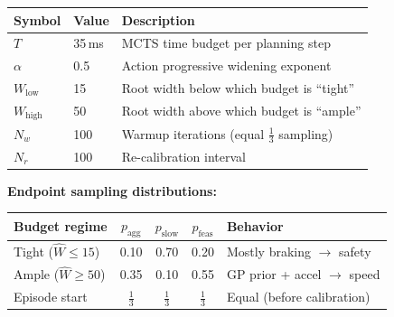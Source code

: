 \documentclass[border=10pt]{standalone}
\begin{document}
\begin{minipage}{0.85\textwidth}
\begin{center}
\renewcommand{\arraystretch}{1.3}
\begin{tabular}{l l l}
\toprule
\textbf{Symbol} & \textbf{Value} & \textbf{Description} \\
\midrule
$T$ & 35\,ms & MCTS time budget per planning step \\
$\alpha$ & 0.5 & Action progressive widening exponent \\
$W_{\text{low}}$ & 15 & Root width below which budget is ``tight'' \\
$W_{\text{high}}$ & 50 & Root width above which budget is ``ample'' \\
$N_w$ & 100 & Warmup iterations (equal $\frac{1}{3}$ sampling) \\
$N_r$ & 100 & Re-calibration interval \\
\bottomrule
\end{tabular}
\end{center}

\vspace{1em}

\noindent\textbf{Endpoint sampling distributions:}

\vspace{0.5em}

\begin{center}
\renewcommand{\arraystretch}{1.3}
\begin{tabular}{l c c c l}
\toprule
\textbf{Budget regime} & $p_{\text{agg}}$ & $p_{\text{slow}}$ & $p_{\text{feas}}$ & \textbf{Behavior} \\
\midrule
Tight\; ($\hat{W} \leq 15$) & 0.10 & 0.70 & 0.20 & Mostly braking $\to$ safety \\
Ample\; ($\hat{W} \geq 50$) & 0.35 & 0.10 & 0.55 & GP prior + accel $\to$ speed \\
Episode start & $\tfrac{1}{3}$ & $\tfrac{1}{3}$ & $\tfrac{1}{3}$ & Equal (before calibration) \\
\bottomrule
\end{tabular}
\end{center}

\end{minipage}
\end{document}

